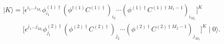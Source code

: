 \begin{equation}
\begin{array}{l}
\label{yvacu}
\mid K \rangle= 
\bigl[ \epsilon ^{i_1...i_{M_1}} \phi^{(1)\dag}_{i_1} 
(\phi^{\dag(1)}C^{(1)\dag})_{i_2} \cdots
(\phi^{(1)\dag} C^{(1)\dag M_1-1})_{i_{M_1}} \bigr]^{K}\\
\qquad \ \ \ ~\bigl[ \epsilon ^{j_1...j_{M_2}} \phi^{(2)\dag}_{j_1} 
(\phi^{(2)\dag}C^{(2)\dag})_{j_2} \cdots
(\phi^{(2)\dag} C^{(2)\dag M_2-1})_{j_{M_2}} \bigr]^{K}
 \mid 0 \rangle.
\end{array}
\end{equation}


